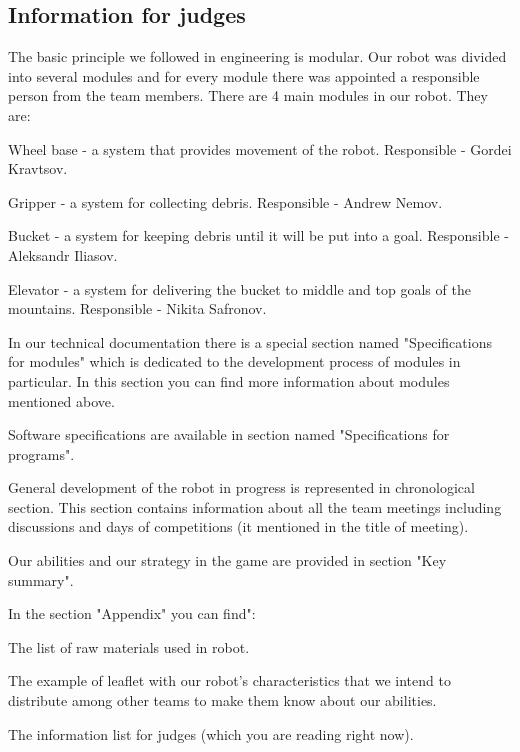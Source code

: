 \subsection{Information for judges}

 \newline

The basic principle we followed in engineering is modular. Our robot was divided into several modules and for every module there was appointed a responsible person from the team members. There are 4 main modules in our robot. They are:

\begin{enumerate*}
	
	\item Wheel base - a system that provides movement of the robot. Responsible - Gordei Kravtsov.
	
	\item Gripper - a system for collecting debris. Responsible - Andrew Nemov.
	
	\item Bucket - a system for keeping debris until it will be put into a goal. Responsible - Aleksandr Iliasov.
	
	\item Elevator - a system for delivering the bucket to middle and top goals of the mountains. Responsible - Nikita Safronov.
	
\end{enumerate*}

In our technical documentation there is a special section named "Specifications for modules" which is dedicated to the development process of modules in particular. In this section you can find more information about modules mentioned above.

Software specifications are available in section named "Specifications for programs".

General development of the robot in progress is represented in chronological section. This section contains information about all the team meetings including discussions and days of competitions (it mentioned in the title of meeting).

Our abilities and our strategy in the game are provided in section "Key summary".

In the section "Appendix" you can find":
\begin{enumerate*}
	\item The list of raw materials used in robot.
	
	\item The example of leaflet with our robot's characteristics that we intend to distribute among other teams to make them know about our abilities.
	
	\item The information list for judges (which you are reading right now).
	
\end{enumerate*}

